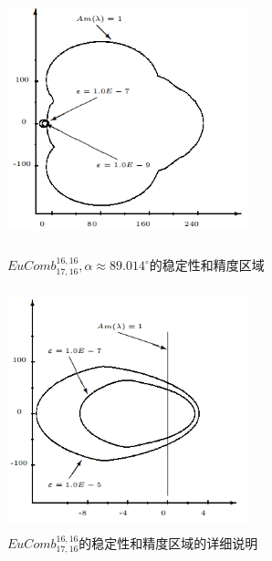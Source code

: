 \documentclass[12pt,a4paper]{article}
\begin{document}
\begin{figure}[H]
	{
		\begin{minipage}{6cm}
			\centering
			\includegraphics[width=7cm,height=7cm]{./figures/19.png}
			\caption{$EuComb_{17,16}^{16,16}, \alpha \approx 89.014^{\circ}$的稳定性和精度区域}
			\label{5.19}
		\end{minipage}
	}
	{
		\begin{minipage}{6cm}
			\centering
			\includegraphics[width=7cm,height=7cm]{./figures/20.png}
			\caption{$EuComb_{17,16}^{16,16}$的稳定性和精度区域的详细说明}
			\label{5.20}
		\end{minipage}
	}
\end{figure}
\end{document}
